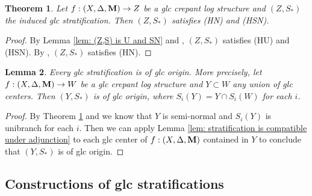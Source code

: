 \documentclass[11pt]{amsart}
\numberwithin{equation}{section}
\newcommand{\Mm}{{\bf{M}}}
\newtheorem{thm}{Theorem}[section]
\newtheorem{lem}[thm]{Lemma}
\theoremstyle{definition}
\theoremstyle{definition}
\theoremstyle{definition}
\begin{document}
\begin{thm}\label{thm: (Z,S) is HN and HSN}
  Let $f:(X,\Delta,\Mm)\to Z$ be a glc crepant log structure and
  $(Z,S_*)$ the induced glc stratification. Then $(Z,S_*)$ satisfies
  (HN) and (HSN).
\end{thm}
\begin{proof}
  By Lemma \ref{lem: (Z,S) is U and SN} and \cite[Definitions
  9.18,~9.19]{Kol13}, $(Z,S_*)$ satisfies (HU) and (HSN). By
  \cite[Theorem 9.21]{Kol13}, $(Z,S_*)$  satisfies (HN).
\end{proof}

\begin{lem}\label{lem: glc stratification is of glc origin}
  Every glc stratification is of glc origin. More precisely, let
  $f:(X,\Delta,\Mm)\to W $ be a glc crepant log structure and
  $Y\subset W$ any union of glc centers. Then $(Y, S_*)$ is of glc
  origin, where $S_i(Y)=Y\cap S_i(W)$ for each $i$.
\end{lem}

\begin{proof}
  By Theorem \ref{thm: (Z,S) is HN and HSN} and \cite[Theorem
  9.26]{Kol13} we know that $Y$ is semi-normal and $S_i(Y)$ is
  unibranch for each $i$. Then we can apply Lemma \ref{lem:
  stratification is compatible under adjunction} to each glc center
  of $f: (X,\Delta,\Mm)$ contained in $Y$ to conclude that $(Y, S_*)$
  is of glc origin.
\end{proof}

\subsection{Constructions of glc stratifications}
\end{document}
